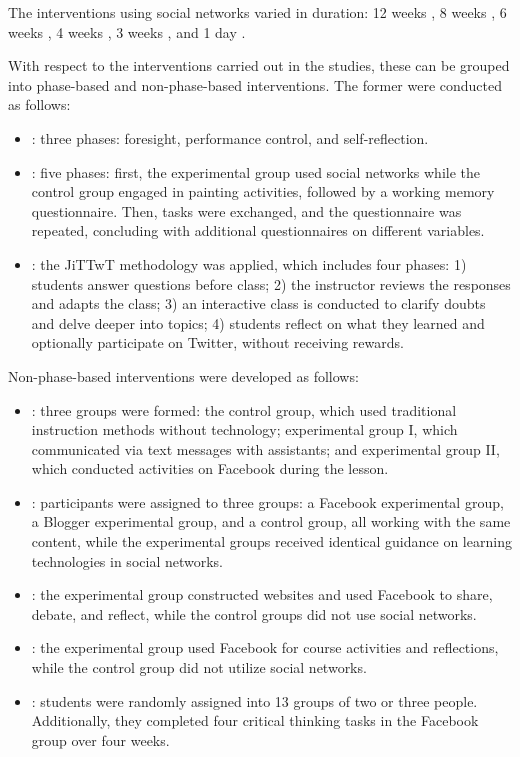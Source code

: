 \documentclass[english]{textolivre}
\begin{document}
The interventions using social networks varied in duration: 12 weeks \cite{alexiou2020, salasrueda2019}, 8 weeks \cite{penalba2020}, 6 weeks \cite{perezsuasnavas2022}, 4 weeks \cite{salasrueda2018, zulkifli2018}, 3 weeks \cite{demirbilek2018}, and 1 day \cite{almarzouki2022}.

With respect to the interventions carried out in the studies, these can be grouped into phase-based and non-phase-based interventions. The former were conducted as follows:

\begin{itemize}
    \item \textcite{alexiou2020}: three phases: foresight, performance control, and self-reflection.
\item \textcite{almarzouki2022}: five phases: first, the experimental group used social networks while the control group engaged in painting activities, followed by a working memory questionnaire. Then, tasks were exchanged, and the questionnaire was repeated, concluding with additional questionnaires on different variables.
\item \textcite{perezsuasnavas2022}: the JiTTwT methodology was applied, which includes four phases: 1) students answer questions before class; 2) the instructor reviews the responses and adapts the class; 3) an interactive class is conducted to clarify doubts and delve deeper into topics; 4) students reflect on what they learned and optionally participate on Twitter, without receiving rewards.
\end{itemize}
\medskip

Non-phase-based interventions were developed as follows:

\begin{itemize}
    \item \textcite{demirbilek2018}: three groups were formed: the control group, which used traditional instruction methods without technology; experimental group I, which communicated via text messages with assistants; and experimental group II, which conducted activities on Facebook during the lesson.
\item \textcite{penalba2020}: participants were assigned to three groups: a Facebook experimental group, a Blogger experimental group, and a control group, all working with the same content, while the experimental groups received identical guidance on learning technologies in social networks.
\item \textcite{salasrueda2019}: the experimental group constructed websites and used Facebook to share, debate, and reflect, while the control groups did not use social networks.
\item \textcite{salasrueda2018}: the experimental group used Facebook for course activities and reflections, while the control group did not utilize social networks.
\item \textcite{zulkifli2018}: students were randomly assigned into 13 groups of two or three people. Additionally, they completed four critical thinking tasks in the Facebook group over four weeks.
\end{itemize}
\end{document}
